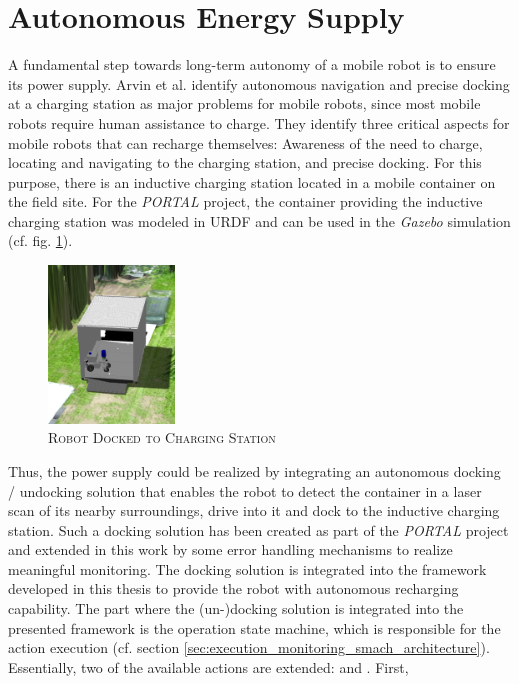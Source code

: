\documentclass[english, master, utf8]{base/thesis_KBS}
\newcommand{\code}{\collectverb{\codebox}}
\begin{document}
\vfill
\pagebreak

\section{Autonomous Energy Supply}
\label{sec:docking_solution}

A fundamental step towards long-term autonomy of a mobile robot is to ensure its power supply. Arvin et al. \cite{Arvin:2009} identify autonomous navigation and precise docking at
a charging station as major problems for mobile robots, since most mobile robots require human assistance to charge. They identify three critical aspects for mobile robots that can
recharge themselves: Awareness of the need to charge, locating and navigating to the charging station, and precise docking. For this purpose, there is an inductive charging station
located in a mobile container on the field site. For the \textit{PORTAL} project, the container providing the inductive charging station was modeled in URDF and can be used in the \textit{Gazebo} simulation (cf.
fig. \ref{fig:container_model}).
\begin{figure}[H]
    \centering
    \includegraphics[width=0.3\textwidth]{pics/docked.png}
    \caption{\textsc{Robot Docked to Charging Station}}
    \label{fig:container_model}
\end{figure}
Thus, the power supply could be realized by integrating an autonomous docking / undocking solution that enables the robot to detect the container in a laser scan of its nearby
surroundings, drive into it and dock to the inductive charging station. Such a docking solution has been created as part of the \textit{PORTAL} project and extended in this work by some
error handling mechanisms to realize meaningful monitoring. The docking solution is integrated into the framework developed in this thesis to provide the robot with autonomous
recharging capability. The part where the (un-)docking solution is integrated into the presented framework is
the operation state machine, which is responsible for the action execution (cf. section \ref{sec:execution_monitoring_smach_architecture}). Essentially, two of the available actions are extended: \code{return_to_base} and \code{charge}. First,
\end{document}
